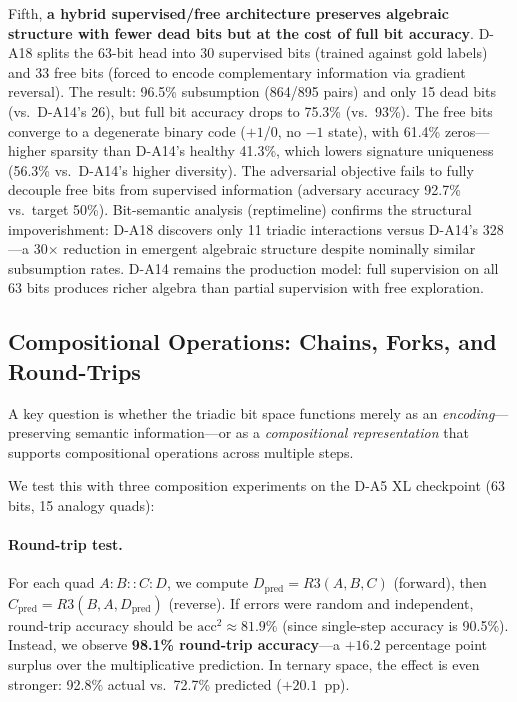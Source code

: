 \documentclass[11pt,a4paper]{article}
\begin{document}
Fifth, \textbf{a hybrid supervised/free architecture preserves algebraic structure with fewer dead bits but at the cost of full bit accuracy}. D-A18 splits the 63-bit head into 30 supervised bits (trained against gold labels) and 33 free bits (forced to encode complementary information via gradient reversal). The result: 96.5\% subsumption (864/895 pairs) and only 15 dead bits (vs.\ D-A14's 26), but full bit accuracy drops to 75.3\% (vs.\ 93\%). The free bits converge to a degenerate binary code ($+1$/$0$, no $-1$ state), with 61.4\% zeros---higher sparsity than D-A14's healthy 41.3\%, which lowers signature uniqueness (56.3\% vs.\ D-A14's higher diversity). The adversarial objective fails to fully decouple free bits from supervised information (adversary accuracy 92.7\% vs.\ target 50\%). Bit-semantic analysis (reptimeline) confirms the structural impoverishment: D-A18 discovers only 11 triadic interactions versus D-A14's 328---a 30$\times$ reduction in emergent algebraic structure despite nominally similar subsumption rates. D-A14 remains the production model: full supervision on all 63 bits produces richer algebra than partial supervision with free exploration.


\subsection{Compositional Operations: Chains, Forks, and Round-Trips}
\label{sec:composition}

A key question is whether the triadic bit space functions merely as an \emph{encoding}---preserving semantic information---or as a \emph{compositional representation} that supports compositional operations across multiple steps.

We test this with three composition experiments on the D-A5 XL checkpoint (63 bits, 15 analogy quads):

\paragraph{Round-trip test.} For each quad $A{:}B{::}C{:}D$, we compute $D_{\text{pred}} = R3(A,B,C)$ (forward), then $C_{\text{pred}} = R3(B,A,D_{\text{pred}})$ (reverse). If errors were random and independent, round-trip accuracy should be $\text{acc}^2 \approx 81.9\%$ (since single-step accuracy is 90.5\%). Instead, we observe \textbf{98.1\% round-trip accuracy}---a $+16.2$ percentage point surplus over the multiplicative prediction. In ternary space, the effect is even stronger: 92.8\% actual vs.\ 72.7\% predicted ($+20.1$~pp).
\end{document}
